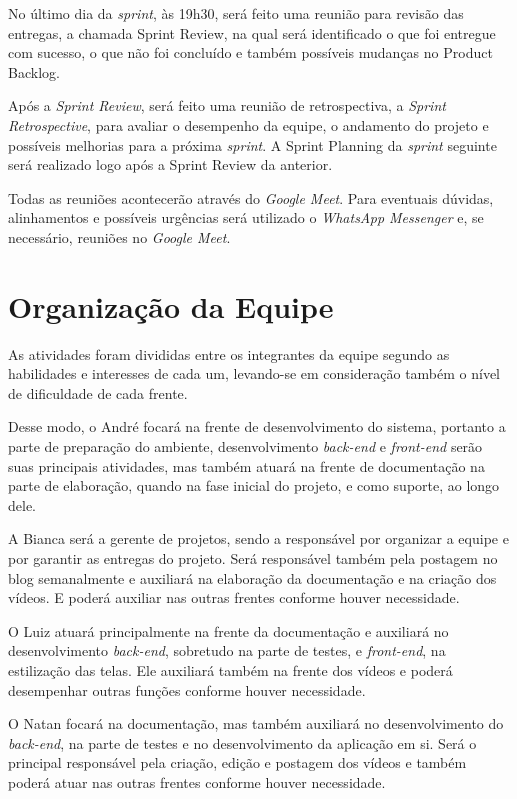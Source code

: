 \documentclass[
    12pt,               %
    openright,          %
    oneside,
    a4paper,            %
    paginasA3,  %
    MODELO,             %
    TODO,               %
    english,            %
    brazil              %
    ]{ifsp-spo-inf-ctds} %
\begin{document}
No último dia da \textit{sprint}, às 19h30, será feito uma reunião para revisão das entregas, a chamada Sprint Review, na qual será identificado o que foi entregue com sucesso, o que não foi concluído e também possíveis mudanças no Product Backlog. 

Após a \textit{Sprint Review}, será feito uma reunião de retrospectiva, a \textit{Sprint Retrospective}, para avaliar o desempenho da equipe, o andamento do projeto e possíveis melhorias para a próxima \textit{sprint}. A Sprint Planning da \textit{sprint} seguinte será realizado logo após a Sprint Review da anterior.

Todas as reuniões acontecerão através do \textit{Google Meet}.
Para eventuais dúvidas, alinhamentos e possíveis urgências será utilizado o \textit{WhatsApp Messenger} e, se necessário, reuniões no \textit{Google Meet}. 


\section{Organização da Equipe}
As atividades foram divididas entre os integrantes da equipe segundo as habilidades e interesses de cada um, levando-se em consideração também o nível de dificuldade de cada frente.

Desse modo, o André focará na frente de desenvolvimento do sistema, portanto a parte de preparação do ambiente, desenvolvimento \textit{back-end} e \textit{front-end} serão suas principais atividades, mas também atuará na frente de documentação na parte de elaboração, quando na fase inicial do projeto, e como suporte, ao longo dele.

A Bianca será a gerente de projetos, sendo a responsável por organizar a equipe e por garantir as entregas do projeto. Será responsável também pela postagem no blog semanalmente e auxiliará na elaboração da documentação e na criação dos vídeos. E poderá auxiliar nas outras frentes conforme houver necessidade.

O Luiz atuará principalmente na frente da documentação e auxiliará no desenvolvimento \textit{back-end}, sobretudo na parte de testes, e \textit{front-end}, na estilização das telas. Ele auxiliará também na frente dos vídeos e poderá desempenhar outras funções conforme houver necessidade.

O Natan focará na documentação, mas também auxiliará no desenvolvimento do \textit{back-end}, na parte de testes e no desenvolvimento da aplicação em si. Será o principal responsável pela criação, edição e postagem dos vídeos e também poderá atuar nas outras frentes conforme houver necessidade.
\end{document}
